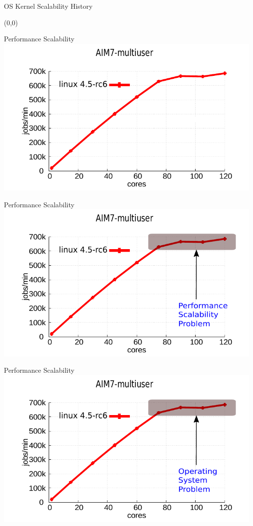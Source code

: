 \documentclass[english]{beamer} %
\begin{document}
\begin{frame}{OS Kernel Scalability History}
\begin{textblock}{1}(0,0)
\end{textblock}
\end{frame}



\begin{frame}{Performance Scalability}
\includegraphics[scale=0.8]{graph/aim7_default}
\end{frame}

\begin{frame}{Performance Scalability}
\includegraphics[scale=0.8]{graph/aim7_default_2}
\end{frame}

\begin{frame}{Performance Scalability}
\includegraphics[scale=0.8]{graph/aim7_default_3}
\end{frame}
\end{document}

